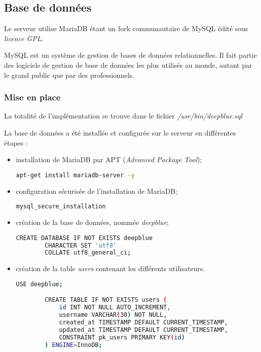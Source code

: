 \subsection{Base de données}
\label{subsec:bd}

Le serveur utilise MariaDB étant un fork communautaire de MySQL édité sous \\
\emph{licence GPL}.

MySQL est un système de gestion de bases de données relationnelles. Il fait
partie des logiciels de gestion de base de données les plus utilisés au monde,
autant par le grand public que par des professionnels.

\subsubsection{Mise en place}
\label{subsubsec:mise-en-place}

La totalité de l'implémentation se trouve dans le fichier
\textit{/usr/bin/deepblue.sql}

La base de données a été installée et configurée sur le serveur en différentes
étapes :
\begin{itemize}
\item installation de MariaDB par APT
  (\emph{Advanced Package Tool});

  \begin{lstlisting}[language=bash]
    apt-get install mariadb-server -y
  \end{lstlisting}

\item configuration sécurisée de l'installation de MariaDB;

  \begin{lstlisting}[language=bash]
    mysql_secure_installation
  \end{lstlisting}

\item création de la base de données, nommée \emph{deepblue};

  \begin{lstlisting}[language=bash]
        CREATE DATABASE IF NOT EXISTS deepblue
        CHARACTER SET 'utf8'
        COLLATE utf8_general_ci;
      \end{lstlisting}

    \item création de la table \og \textit{users} \fg contenant les
      différents utilisateurs.

      \begin{lstlisting}[language=bash]
        USE deepblue;

        CREATE TABLE IF NOT EXISTS users (
            id INT NOT NULL AUTO_INCREMENT,
            username VARCHAR(30) NOT NULL,
            created_at TIMESTAMP DEFAULT CURRENT_TIMESTAMP,
            updated_at TIMESTAMP DEFAULT CURRENT_TIMESTAMP,
            CONSTRAINT pk_users PRIMARY KEY(id)
        ) ENGINE=InnoDB;
      \end{lstlisting}
\end{itemize}

